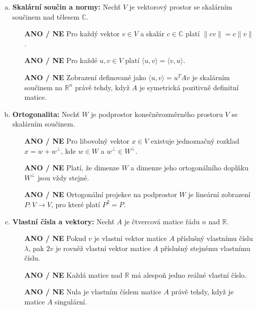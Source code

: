 \documentclass[a4paper,11pt]{article}
\begin{document}
\begin{enumerate}[(a)]
    \item \textbf{Skalární součin a normy:} Nechť $V$ je vektorový prostor se skalárním součinem nad tělesem $\mathbb{C}$.
    \begin{itemize}
        \item[\textbf{ANO / NE}] Pro každý vektor $v \in V$ a skalár $c \in \mathbb{C}$ platí $\|c v\| = c \|v\|$.
        \item[\textbf{ANO / NE}] Pro každé $u, v \in V$ platí $\langle u, v \rangle = \langle v, u \rangle$.
        \item[\textbf{ANO / NE}] Zobrazení definované jako $\langle u, v \rangle = u^T A v$ je skalárním součinem na $\mathbb{R}^n$ právě tehdy, když $A$ je symetrická pozitivně definitní matice.
    \end{itemize}

    \item \textbf{Ortogonalita:} Nechť $W$ je podprostor konečněrozměrného prostoru $V$ se skalárním součinem.
    \begin{itemize}
        \item[\textbf{ANO / NE}] Pro libovolný vektor $x \in V$ existuje jednoznačný rozklad $x = w + w^\perp$, kde $w \in W$ a $w^\perp \in W^\perp$.
        \item[\textbf{ANO / NE}] Platí, že dimenze $W$ a dimenze jeho ortogonálního doplňku $W^\perp$ jsou vždy stejné.
        \item[\textbf{ANO / NE}] Ortogonální projekce na podprostor $W$ je lineární zobrazení $P: V \to V$, pro které platí $P^2 = P$.
    \end{itemize}

    \item \textbf{Vlastní čísla a vektory:} Nechť $A$ je čtvercová matice řádu $n$ nad $\mathbb{R}$.
    \begin{itemize}
        \item[\textbf{ANO / NE}] Pokud $v$ je vlastní vektor matice $A$ příslušný vlastnímu číslu $\lambda$, pak $2v$ je rovněž vlastní vektor matice $A$ příslušný stejnému vlastnímu číslu.
        \item[\textbf{ANO / NE}] Každá matice nad $\mathbb{R}$ má alespoň jedno reálné vlastní číslo.
        \item[\textbf{ANO / NE}] Nula je vlastním číslem matice $A$ právě tehdy, když je matice $A$ singulární.
    \end{itemize}


\end{enumerate}
\end{document}
